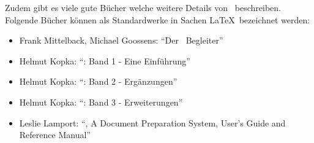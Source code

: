 Zudem gibt es viele gute Bücher welche weitere Details von \DMLLaTeX \ beschreiben. Folgende Bücher können als Standardwerke in Sachen \LaTeX \ bezeichnet werden:

\begin{itemize}
	\item{Frank Mittelback, Michael Goossens: \enquote{Der \DMLLaTeX \ Begleiter}\cite{DerLaTeXBegleiter}}
	\item{Helmut Kopka: \enquote{\DMLLaTeX: Band 1 - Eine Einführung}\cite{kopka:band1}}
	\item{Helmut Kopka: \enquote{\DMLLaTeX: Band 2 - Ergänzungen}\cite{kopka:band2}}
	\item{Helmut Kopka: \enquote{\DMLLaTeX: Band 3 - Erweiterungen}\cite{kopka:band3}}
	\item{Leslie Lamport: \enquote{\DMLLaTeX, A Document Preparation System, User's Guide and Reference Manual}\cite{lamport:latex}}
\end{itemize}





